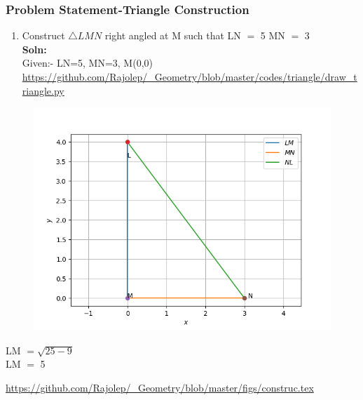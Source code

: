 \begin{frame}
\frametitle{Problem Statement-Triangle Construction}
\begin{enumerate}[label=(\roman*)]
\item Construct $\triangle LMN$ right angled at M such that LN $=$ 5  MN $=$ 3\\
\textbf{Soln:}\\
Given:- LN=5, MN=3, M(0,0)\\
\url{https://github.com/Rajolep/_Geometry/blob/master/codes/triangle/draw_triangle.py}
\end{enumerate}
\begin{figure}
\includegraphics[scale=0.4]{./figs/tricon.png}
\end{figure}
\end{frame}
\begin{frame}
LM $= \sqrt{25-9}$\\
LM $=$ 5
\begin{figure}
\end{figure}
\url{https://github.com/Rajolep/_Geometry/blob/master/figs/construc.tex}
\end{frame}